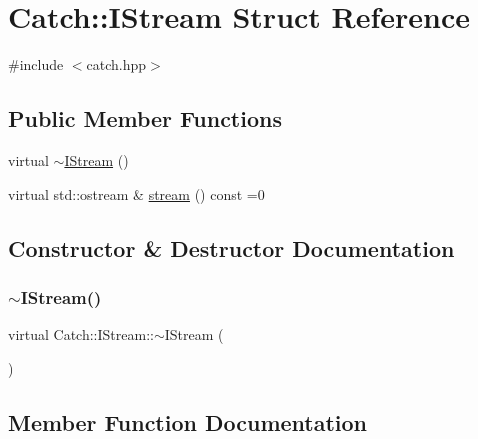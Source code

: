 \hypertarget{struct_catch_1_1_i_stream}{}\section{Catch\+::I\+Stream Struct Reference}
\label{struct_catch_1_1_i_stream}


{\ttfamily \#include $<$catch.\+hpp$>$}

\subsection*{Public Member Functions}
\begin{DoxyCompactItemize}
\item 
virtual \mbox{\hyperlink{struct_catch_1_1_i_stream_a344a88d0e5fc1f727f5801c72b4a4e2a}{$\sim$\+I\+Stream}} ()
\item 
virtual std\+::ostream \& \mbox{\hyperlink{struct_catch_1_1_i_stream_a55a9ddbe250261ff38642f480ebdd902}{stream}} () const =0
\end{DoxyCompactItemize}


\subsection{Constructor \& Destructor Documentation}
\mbox{\label{struct_catch_1_1_i_stream_a344a88d0e5fc1f727f5801c72b4a4e2a}} 
\subsubsection{\texorpdfstring{$\sim$IStream()}{~IStream()}}
{\footnotesize\ttfamily virtual Catch\+::\+I\+Stream\+::$\sim$\+I\+Stream (\begin{DoxyParamCaption}{ }\end{DoxyParamCaption})\hspace{0.3cm}{\ttfamily [virtual]}}



\subsection{Member Function Documentation}
\mbox{\label{struct_catch_1_1_i_stream_a55a9ddbe250261ff38642f480ebdd902}} 
